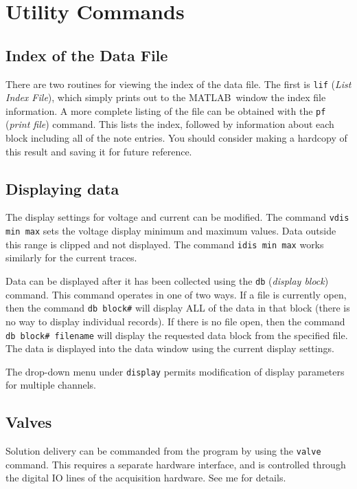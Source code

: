 \documentclass[11pt, letterpaper, titlepage]{paper}
\newcommand{\ml}{\textsf{MATLAB}}
\begin{document}
\section{Utility Commands}

\subsection{Index of the Data File}

There are two routines for viewing the index of the data file. The first is \texttt{lif} 
(\textsl{List Index File}), which simply prints out to the \ml\ window the index file 
information. A more complete listing of the file can be obtained with the \texttt{pf} 
(\textsl{print file}) command. This lists the index, followed by information about each 
block including all of the note entries. You should consider making a hardcopy of this 
result and saving it for future reference.

\subsection{Displaying data}

The display settings for voltage and current can be modified. The command \texttt{vdis 
min max} sets the voltage display minimum and maximum values. Data outside this range is 
clipped and not displayed. The command \texttt{idis min max} works similarly for the 
current traces.

Data can be displayed after it has been collected using the \texttt{db} (\textsl{display 
block}) command. This command operates in one of two ways. If a file is currently open, 
then the command \texttt{db block\#} will display ALL of the data in that block (there is 
no way to display individual records). If there is no file open, then the command 
\texttt{db block\# filename} will display the requested data block from the specified 
file. The data is displayed into the data window using the current display settings.

The drop-down menu under \texttt{display} permits modification of 
display parameters for multiple channels.

\subsection{Valves}
Solution delivery can be commanded from the program by using the 
\texttt{valve} command. This requires a separate hardware 
interface, and is controlled through the digital IO lines of the 
acquisition hardware. See me for details.
\end{document}
